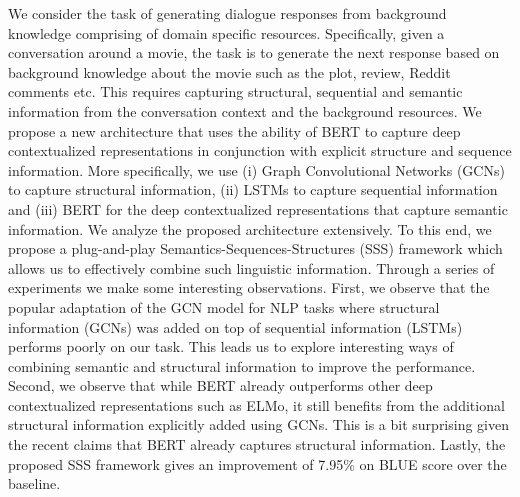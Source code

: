 We consider the task of generating dialogue responses from background knowledge comprising of domain specific resources. Specifically, given a conversation around a movie, the task is to generate the next response based on background knowledge about the movie such as the plot, review, Reddit comments etc. This requires capturing structural, sequential and semantic information from the conversation context and the background resources. We propose a new architecture that uses the ability of BERT to capture deep contextualized representations in conjunction with explicit structure and sequence information. More specifically, we use (i) Graph Convolutional Networks (GCNs) to capture structural information, (ii) LSTMs to capture sequential information and (iii) BERT for the deep contextualized representations that capture semantic information. We analyze the proposed architecture extensively. To this end, we propose a plug-and-play Semantics-Sequences-Structures (SSS) framework which allows us to effectively combine such linguistic information. Through a series of experiments we make some interesting observations. First, we observe that the popular adaptation of the GCN model for NLP tasks where structural information (GCNs) was added on top of sequential information (LSTMs) performs poorly on our task. This leads us to explore interesting ways of combining semantic and structural information to improve the performance. Second, we observe that while BERT already outperforms other deep contextualized representations such as ELMo, it still benefits from the additional structural information explicitly added using GCNs. This is a bit surprising given the recent claims that BERT already captures structural information. Lastly, the proposed SSS framework gives an improvement of 7.95\% on BLUE score over the baseline.
